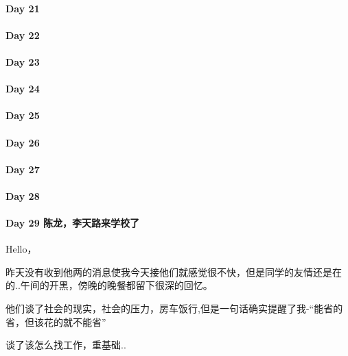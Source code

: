 \documentclass[UTF8,a4paper,8pt]{ctexart}
\begin{document}
 	 \paragraph{Day 21      \quad     }
 	 \paragraph{Day 22      \quad     }
 	 \paragraph{Day 23      \quad     }
 	 \paragraph{Day 24      \quad     }
 	 \paragraph{Day 25      \quad     }
 	 \paragraph{Day 26      \quad     }
 	 \paragraph{Day 27      \quad     }
 	 \paragraph{Day 28      \quad     }
 	 \paragraph{Day 29  陈龙，李天路来学校了    \quad     } 
	 	 Hello， 
	 	 
	 	 昨天没有收到他两的消息使我今天接他们就感觉很不快，但是同学的友情还是在的..午间的开黑，傍晚的晚餐都留下很深的回忆。
	 	 
	 	 他们谈了社会的现实，社会的压力，房车饭行,但是一句话确实提醒了我-“能省的省，但该花的就不能省”
	 	 
	 	 谈了该怎么找工作，重基础..  
\end{document}
